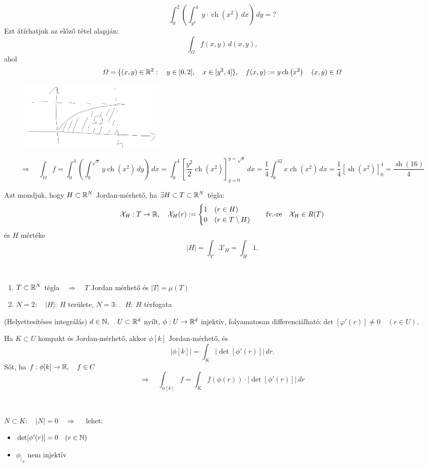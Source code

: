 \documentclass[a4paper,11.5pt]{article}
\DeclareMathOperator{\sh}{sh}
\DeclareMathOperator{\ch}{ch}
\begin{document}
	\begin{task}
		\[ \int_0^2\left(\int_{y^4}^4y\cdot\ch\left(x^2\right)\,dx \right)\,dy=? \]
		Ezt átírhatjuk az előző tétel alapján:
		\[ \int_{\varOmega}^{}f(x,y)\,d(x,y), \]
		ahol 
		\[ \varOmega=\{(x,y)\in\R^2:\quad y\in[0,2], \quad x\in[y^2,4]\},\quad f(x,y):=y\ch\left(x^2\right)\quad (x,y)\in\varOmega  \]
		\begin{figure}[h]
			\centering
			\includegraphics[width=7cm]{kepek/01.png}
			\caption{}
		\end{figure}
		\[ \Rightarrow \quad \int_{\varOmega}^{}f=\int_0^4\left(\int_{0}^{\sqrt{x}}y\ch\left(x^2\right)\,dy\right)\,dx=\int_{0}^{4}\left[\frac{y^2}{2}\ch\left(x^2\right)\right]_{y=0}^{y=\sqrt{x}}\,dx=\frac{1}{4}\int_0^42x\ch\left(x^2\right)\,dx=\frac{1}{4}\left[\sh\left(x^2\right)\right]_0^4=\frac{\sh(16)}{4} \]
	\end{task}
	\begin{definition}
		Azt mondjuk, hogy $H\subset\mathbb{R}^N$ Jordan-mérhető, ha $\exists H\subset T\subset\mathbb{R}^N$ tégla:
		\[ \mathcal{X}_H:T\to\mathbb{R},\quad \mathcal{X}_H(r):=\begin{cases}
			1\quad (r\in H)\\
			0\quad (r\in T\setminus H)
		\end{cases}\quad \text{fv.-re}\quad \mathcal{X}_H\in R(T)\]
		és $H$ mértéke
		\[ |H|=\int_T\mathcal{X}_H=\int_H1. \]
	\end{definition}
	\begin{note}\ 
		
		\begin{enumerate}
			\item $T\subset\mathbb{R}^N$ tégla\quad$\quad \Rightarrow\quad T$ Jordan mérhető és $|T|=\mu(T)$
			\item $N=2:\quad |H|:\ H$ területe, $N=3:\quad H:\ H$ térfogata 
		\end{enumerate}
	\end{note}
	\begin{theorem}
		(Helyettesítéses integrálás)  $d\in\mathbb{N},\quad U\subset\mathbb{R}^d$ nyílt, $\phi:U\to\mathbb{R}^d$ injektív, folyamatosan differenciálható:\quad $\det[\varphi'(r)]\not=0\quad (r\in U)$. 
		
		Ha $K\subset U$ kompakt és Jordan-mérhető, akkor $\phi[k]$ Jordan-mérhető, és
		\[ |\phi[k]|=\int_K|\det[\phi'(r)]|\,dr. \]
		 Sőt, ha $f:\phi[k]\to\mathbb{R},\quad f\in C$
		 \[ \Rightarrow\quad \int_{\phi[k]}f=\int_Kf(\phi(r))\cdot\big|\det[\phi'(r)]\big|\,dr \]
	\end{theorem}
	\begin{note}\
		
		$N\subset K:\quad |N|=0\quad \Rightarrow\quad$ lehet:
		\begin{itemize}[$\bullet$]
			\item $\det[\phi'(r)]=0\quad (r\in\mathbb{N})$
			\item $\phi_{\big|_N}$ nem injektív
		\end{itemize}
	\end{note}
\end{document}
